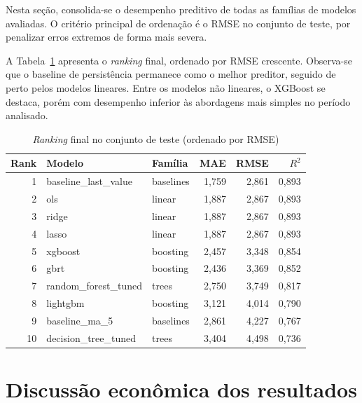 Nesta seção, consolida-se o desempenho preditivo de todas as famílias de modelos
avaliadas. O critério principal de ordenação é o RMSE no conjunto de teste, por
penalizar erros extremos de forma mais severa.

A Tabela~\ref{tab:cap6_ranking_test} apresenta o \textit{ranking} final, ordenado
por RMSE crescente. Observa-se que o baseline de persistência permanece como o
melhor preditor, seguido de perto pelos modelos lineares. Entre os modelos não
lineares, o XGBoost se destaca, porém com desempenho inferior às abordagens mais
simples no período analisado.

\begin{table}[H]
\centering
\caption{\textit{Ranking} final no conjunto de teste (ordenado por RMSE)}
\label{tab:cap6_ranking_test}
\footnotesize
\begin{tabular}{rllrrr}
\toprule
Rank & Modelo & Família & MAE & RMSE & $R^2$ \\
\midrule
 1 & baseline\_last\_value  & baselines & 1{,}759 & 2{,}861 & 0{,}893 \\
 2 & ols                    & linear    & 1{,}887 & 2{,}867 & 0{,}893 \\
 3 & ridge                  & linear    & 1{,}887 & 2{,}867 & 0{,}893 \\
 4 & lasso                  & linear    & 1{,}887 & 2{,}867 & 0{,}893 \\
 5 & xgboost                & boosting  & 2{,}457 & 3{,}348 & 0{,}854 \\
 6 & gbrt                   & boosting  & 2{,}436 & 3{,}369 & 0{,}852 \\
 7 & random\_forest\_tuned  & trees     & 2{,}750 & 3{,}749 & 0{,}817 \\
 8 & lightgbm               & boosting  & 3{,}121 & 4{,}014 & 0{,}790 \\
 9 & baseline\_ma\_5        & baselines & 2{,}861 & 4{,}227 & 0{,}767 \\
10 & decision\_tree\_tuned  & trees     & 3{,}404 & 4{,}498 & 0{,}736 \\
\bottomrule
\end{tabular}
\end{table}

\section{Discussão econômica dos resultados}
\label{sec:cap6_discussion}

